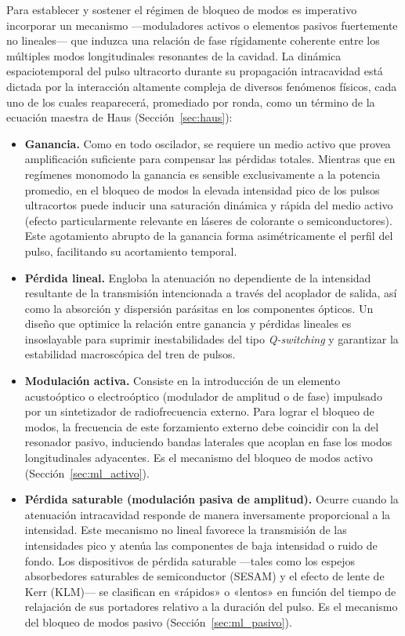 Para establecer y sostener el régimen de bloqueo de modos es imperativo incorporar
un mecanismo —moduladores activos o elementos pasivos fuertemente no lineales— que
induzca una relación de fase rígidamente coherente entre los múltiples modos
longitudinales resonantes de la cavidad. La dinámica espaciotemporal del pulso
ultracorto durante su propagación intracavidad está dictada por la interacción
altamente compleja de diversos fenómenos físicos, cada uno de los cuales
reaparecerá, promediado por ronda, como un término de la ecuación maestra de Haus
(Sección~\ref{sec:haus}):

\begin{itemize}
    \item \textbf{Ganancia.} Como en todo oscilador, se requiere un medio activo
    que provea amplificación suficiente para compensar las pérdidas totales.
    Mientras que en regímenes monomodo la ganancia es sensible exclusivamente a la
    potencia promedio, en el bloqueo de modos la elevada intensidad pico de los
    pulsos ultracortos puede inducir una saturación dinámica y rápida del medio
    activo (efecto particularmente relevante en láseres de colorante o
    semiconductores). Este agotamiento abrupto de la ganancia forma
    asimétricamente el perfil del pulso, facilitando su acortamiento temporal.

    \item \textbf{Pérdida lineal.} Engloba la atenuación no dependiente de la
    intensidad resultante de la transmisión intencionada a través del acoplador de
    salida, así como la absorción y dispersión parásitas en los componentes
    ópticos. Un diseño que optimice la relación entre ganancia y pérdidas lineales
    es insoslayable para suprimir inestabilidades del tipo \emph{Q-switching} y
    garantizar la estabilidad macroscópica del tren de pulsos.

    \item \textbf{Modulación activa.} Consiste en la introducción de un elemento
    acustoóptico o electroóptico (modulador de amplitud o de fase) impulsado por un
    sintetizador de radiofrecuencia externo. Para lograr el bloqueo de modos, la
    frecuencia de este forzamiento externo debe coincidir con la del resonador
    pasivo, induciendo bandas laterales que acoplan en fase los modos
    longitudinales adyacentes. Es el mecanismo del bloqueo de modos activo
    (Sección~\ref{sec:ml_activo}).

    \item \textbf{Pérdida saturable (modulación pasiva de amplitud).} Ocurre cuando
    la atenuación intracavidad responde de manera inversamente proporcional a la
    intensidad. Este mecanismo no lineal favorece la transmisión de las
    intensidades pico y atenúa las componentes de baja intensidad o ruido de fondo.
    Los dispositivos de pérdida saturable —tales como los espejos absorbedores
    saturables de semiconductor (SESAM) y el efecto de lente de Kerr (KLM)— se
    clasifican en «rápidos» o «lentos» en función del tiempo de relajación de sus
    portadores relativo a la duración del pulso. Es el mecanismo del bloqueo de
    modos pasivo (Sección~\ref{sec:ml_pasivo}).


\end{itemize}
